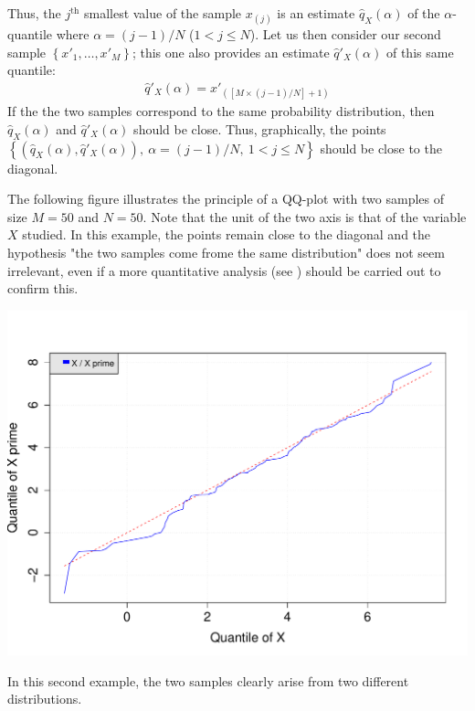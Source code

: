 {  Thus, the $j^\textrm{th}$ smallest value of the sample $x_{(j)}$ is an estimate $\widehat{q}_{X}(\alpha)$ of the $\alpha$-quantile where $\alpha = (j-1)/N$ ($1 < j \leq N$). Let us then consider our second sample $\left\{x'_1,\ldots,x'_M \right\}$; this one also provides an estimate $\widehat{q}'_{X}(\alpha)$ of this same quantile:
  \begin{align*}
    \widehat{q}'_{X}(\alpha) = x'_{([M\times(j-1)/N]+1)}
  \end{align*}
  If the the two samples correspond to the same probability distribution, then $\widehat{q}_{X}(\alpha)$ and $\widehat{q}'_{X}(\alpha)$ should be close. Thus, graphically, the points $\left\{ \left( \widehat{q}_{X}(\alpha),\widehat{q}'_{X}(\alpha)\right),\  \alpha = (j-1)/N,\ 1 < j \leq N \right\}$ should be close to the diagonal.

  The following figure illustrates the principle of a QQ-plot with two samples of size $M=50$ and $N=50$. Note that the unit of the two axis is that of the variable $X$ studied. In this example, the points remain close to the diagonal and the hypothesis "the two samples come frome the same distribution" does not seem irrelevant, even if a more quantitative analysis (see ) should be carried out to confirm this.

  \begin{center}
    \includegraphics[scale=0.5]{Figures/QQplotOk.pdf}
  \end{center}

  In this second example, the two samples clearly arise from two different distributions.

}
